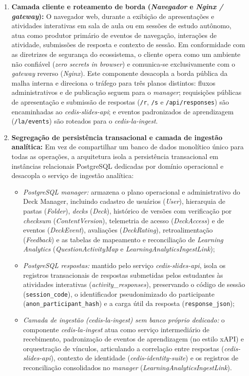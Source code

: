\begin{enumerate}
    \item \textbf{Camada cliente e roteamento de borda (\textit{Navegador} e \textit{Nginx / gateway}):} O navegador web, durante a exibição de apresentações e atividades interativas em sala de aula ou em sessões de estudo autônomo, atua como produtor primário de eventos de navegação, interações de atividade, submissões de resposta e contexto de sessão. Em conformidade com as diretrizes de segurança do ecossistema, o cliente opera como um ambiente não confiável (\textit{zero secrets in browser}) e comunica-se exclusivamente com o \textit{gateway} reverso (\textit{Nginx}). Este componente desacopla a borda pública da malha interna e direciona o tráfego para três planos distintos: fluxos administrativos e de publicação seguem para o \textit{manager}; requisições públicas de apresentação e submissão de respostas (\texttt{/r}, \texttt{/s} e \texttt{/api/responses}) são encaminhadas ao \textit{cedis-slides-api}; e eventos padronizados de aprendizagem (\texttt{/la/events}) são roteados para o \textit{cedis-la-ingest}.

    \item \textbf{Segregação de persistência transacional e camada de ingestão analítica:} Em vez de compartilhar um banco de dados monolítico único para todas as operações, a arquitetura isola a persistência transacional em instâncias relacionais PostgreSQL dedicadas por domínio operacional e desacopla o serviço de ingestão analítica:
    \begin{itemize}
        \item \textit{PostgreSQL manager:} armazena o plano operacional e administrativo do Deck Manager, incluindo cadastro de usuários (\textit{User}), hierarquia de pastas (\textit{Folder}), \textit{decks} (\textit{Deck}), histórico de versões com verificação por \textit{checksum} (\textit{ContentVersion}), telemetria de acesso (\textit{DeckAccess}) e de eventos (\textit{DeckEvent}), avaliações (\textit{DeckRating}), retroalimentação (\textit{Feedback}) e as tabelas de mapeamento e reconciliação de \textit{Learning Analytics} (\textit{QuestionActivityMap} e \textit{LearningAnalyticsIngestLink});
        \item \textit{PostgreSQL respostas:} mantido pelo serviço \textit{cedis-slides-api}, isola os registros transacionais de respostas submetidas pelos estudantes às atividades interativas (\textit{activity\_responses}), preservando o código de sessão (\texttt{session\_code}), o identificador pseudonimizado do participante (\texttt{anon\_participant\_hash}) e a carga útil da resposta (\texttt{response\_json});
        \item \textit{Camada de ingestão (\textit{cedis-la-ingest}) sem banco próprio dedicado:} o componente \textit{cedis-la-ingest} atua como serviço intermediário de recebimento, padronização de eventos de aprendizagem (no estilo xAPI) e orquestração de vínculos, articulando a correlação entre respostas (\textit{cedis-slides-api}), contexto de identidade (\textit{cedis-identity-suite}) e os registros de reconciliação consolidados no \textit{manager} (\textit{LearningAnalyticsIngestLink}).
    \end{itemize}


\end{enumerate}
